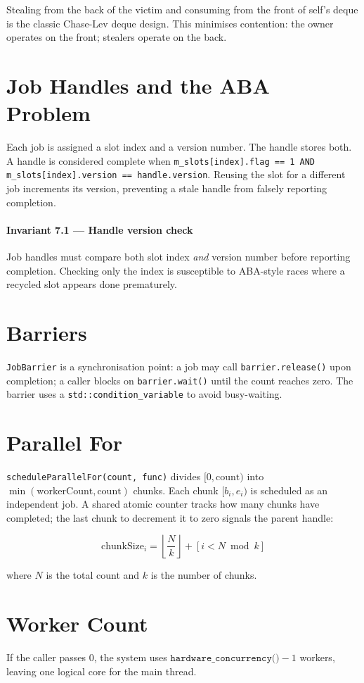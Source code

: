 Stealing from the back of the victim and consuming from the front of
self's deque is the classic Chase-Lev deque design. This minimises
contention: the owner operates on the front; stealers operate on the
back.

\section{Job Handles and the ABA Problem}

Each job is assigned a slot index and a version number.
The handle stores both. A handle is considered complete when
\texttt{m\_slots[index].flag == 1 AND m\_slots[index].version == handle.version}.
Reusing the slot for a different job increments its version, preventing
a stale handle from falsely reporting completion.


\paragraph{Invariant 7.1 --- Handle version check}

  Job handles must compare both slot index \emph{and} version number
  before reporting completion. Checking only the index is susceptible
  to ABA-style races where a recycled slot appears done prematurely.



\section{Barriers}

\texttt{JobBarrier} is a synchronisation point: a job may call
\texttt{barrier.release()} upon completion; a caller blocks on
\texttt{barrier.wait()} until the count reaches zero.
The barrier uses a \texttt{std::condition\_variable} to avoid busy-waiting.

\section{Parallel For}

\texttt{scheduleParallelFor(count, func)} divides $[0, \text{count})$
into $\min(\text{workerCount}, \text{count})$ chunks. Each chunk
$[b_i, e_i)$ is scheduled as an independent job. A shared atomic counter
tracks how many chunks have completed; the last chunk to decrement it
to zero signals the parent handle:

\begin{equation}
\text{chunkSize}_i = \left\lfloor \frac{N}{k} \right\rfloor + [i < N \bmod k]
\end{equation}

where $N$ is the total count and $k$ is the number of chunks.

\section{Worker Count}

If the caller passes 0, the system uses
$\texttt{hardware\_concurrency()} - 1$ workers, leaving one logical
core for the main thread.

